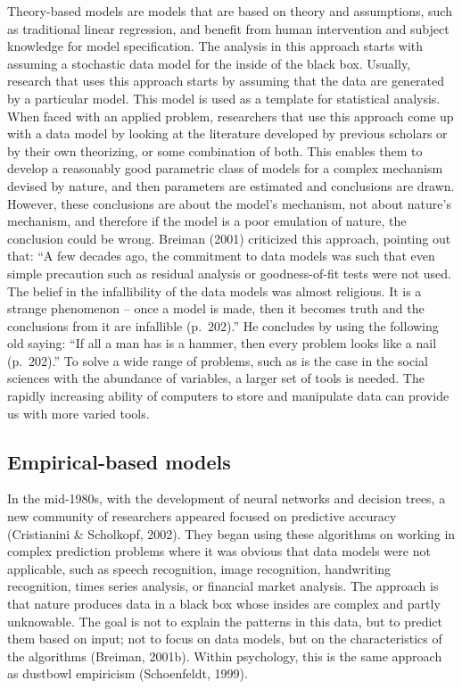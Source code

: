 \documentclass[
  man]{apa7}
\begin{document}
Theory-based models are models that are based on theory and assumptions, such as traditional linear regression, and benefit from human intervention and subject knowledge for model specification.
The analysis in this approach starts with assuming a stochastic data model for the inside of the black box.
Usually, research that uses this approach starts by assuming that the data are generated by a particular model.
This model is used as a template for statistical analysis.
When faced with an applied problem, researchers that use this approach come up with a data model by looking at the literature developed by previous scholars or by their own theorizing, or some combination of both.
This enables them to develop a reasonably good parametric class of models for a complex mechanism devised by nature, and then parameters are estimated and conclusions are drawn.
However, these conclusions are about the model's mechanism, not about nature's mechanism, and therefore if the model is a poor emulation of nature, the conclusion could be wrong.
Breiman (2001) criticized this approach, pointing out that: ``A few decades ago, the commitment to data models was such that even simple precaution such as residual analysis or goodness-of-fit tests were not used. The belief in the infallibility of the data models was almost religious. It is a strange phenomenon -- once a model is made, then it becomes truth and the conclusions from it are infallible (p.~202).'' He concludes by using the following old saying: ``If all a man has is a hammer, then every problem looks like a nail (p.~202).'' To solve a wide range of problems, such as is the case in the social sciences with the abundance of variables, a larger set of tools is needed.
The rapidly increasing ability of computers to store and manipulate data can provide us with more varied tools.

\hypertarget{empirical-based-models}{%
\subsection{Empirical-based models}\label{empirical-based-models}}

In the mid-1980s, with the development of neural networks and decision trees, a new community of researchers appeared focused on predictive accuracy (Cristianini \& Scholkopf, 2002).
They began using these algorithms on working in complex prediction problems where it was obvious that data models were not applicable, such as speech recognition, image recognition, handwriting recognition, times series analysis, or financial market analysis.
The approach is that nature produces data in a black box whose insides are complex and partly unknowable.
The goal is not to explain the patterns in this data, but to predict them based on input; not to focus on data models, but on the characteristics of the algorithms (Breiman, 2001b).
Within psychology, this is the same approach as dustbowl empiricism (Schoenfeldt, 1999).
\end{document}
